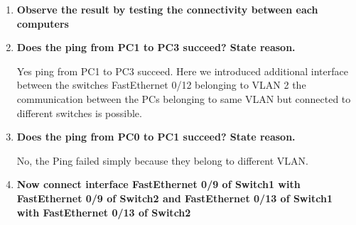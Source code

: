 \documentclass[a4paper,11pt]{article}
\begin{document}
\begin{enumerate}
    \item\textbf{ Observe the result by testing the connectivity between each computers}











    \item\textbf{ Does the ping from PC1 to PC3 succeed? State reason.}

          Yes ping from PC1 to PC3 succeed. Here we introduced additional interface between the switches FastEthernet 0/12 belonging to VLAN 2 the communication between the PCs belonging to same VLAN but connected to different switches is possible.


    \item\textbf{ Does the ping from PC0 to PC1 succeed? State reason.}

          No, the Ping failed simply because they belong to different VLAN.



    \item\textbf{ Now connect interface FastEthernet 0/9 of Switch1 with FastEthernet 0/9 of Switch2 and
              FastEthernet 0/13 of Switch1 with FastEthernet 0/13 of Switch2}


\end{enumerate}
\end{document}

